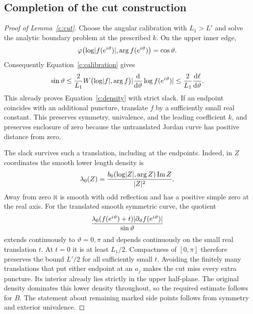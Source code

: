 \subsection{Completion of the cut construction}

\begin{proof}[Proof of Lemma~\ref{c:cut}]
Choose the angular calibration with $L_1>L'$ and solve the analytic
boundary problem at the prescribed $k$.  On the upper inner edge,
\[
 \varphi\bigl(\log\lvert f(e^{i\vartheta})\rvert,
                    \arg f(e^{i\vartheta})\bigr)=\cos\vartheta.
\]
Consequently Equation~\eqref{c:calibration} gives
\[
 \sin\vartheta
 \le \frac{2}{L_1}
 W\bigl(\log\lvert f\rvert,\arg f\bigr)
 \lvert\frac{\mathrm d}{\mathrm d\vartheta}\log f(e^{i\vartheta})\rvert
 \le \frac{2}{L_1}\frac{\mathrm d\ell}{\mathrm d\vartheta}.
\]
This already proves Equation~\eqref{c:density} with strict slack.  If an endpoint
coincides with an additional puncture, translate $f$ by a sufficiently
small real constant.  This preserves symmetry, univalence, and the
leading coefficient $k$, and preserves enclosure of zero because the
untranslated Jordan curve has positive distance from zero.

The slack survives such a translation, including at the endpoints.
Indeed, in $Z$ coordinates the smooth lower length density is
\[
 \lambda_0(Z)
 =\frac{b_0(\log\lvert Z\rvert,\arg Z)\operatorname{Im}Z}{\lvert Z\rvert^2}.
\]
Away from zero it is smooth with odd reflection and has a positive
simple zero at the real axis.  For the translated smooth symmetric
curve, the quotient
\[
 \frac{\lambda_0(f(e^{i\vartheta})+t)
                  \lvert\partial_\vartheta f(e^{i\vartheta})\rvert}
      {\sin\vartheta}
\]
extends continuously to $\vartheta=0,\pi$ and depends continuously on
the small real translation $t$.  At $t=0$ it is at least $L_1/2$.
Compactness of $[0,\pi]$ therefore preserves the bound $L'/2$ for all
sufficiently small $t$.  Avoiding the finitely many translations that
put either endpoint at an $a_j$ makes the cut miss every extra
puncture.  Its interior already lies strictly in the upper half-plane.
The original density dominates this lower density throughout, so the
required estimate follows for $B$.  The statement about remaining
marked side points follows from symmetry and exterior univalence.
\end{proof}
